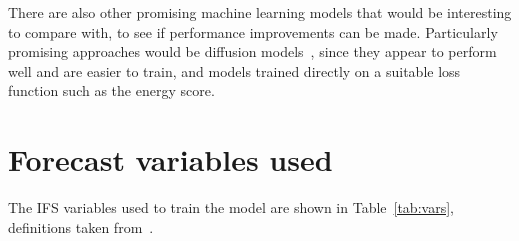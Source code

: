 \documentclass{article}
\begin{document}
There are also other promising machine learning models that would be interesting to compare with, to see if performance improvements can be made. Particularly promising approaches would be diffusion models~\citep{addison_machine_2022}, since they appear to perform well and are easier to train, and models trained directly on a suitable loss function such as the energy score.



\appendix

\section{Forecast variables used}\label{app:fcst_vars}
The IFS variables used to train the model are shown in Table~\ref{tab:vars}, definitions taken from~\citep{ecmwf_parameter_2023}.
\end{document}
